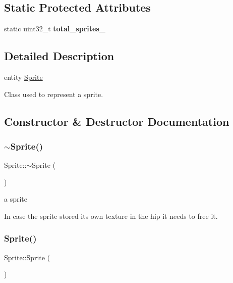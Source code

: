 \subsection*{Static Protected Attributes}
\begin{DoxyCompactItemize}
\item 
\mbox{\label{class_sprite_a1fc1356f60c3d969a5f4cf6b70759e0e}} 
static uint32\+\_\+t {\bfseries total\+\_\+sprites\+\_\+}
\end{DoxyCompactItemize}


\subsection{Detailed Description}
entity \hyperlink{class_sprite}{Sprite}

Class used to represent a sprite. 

\subsection{Constructor \& Destructor Documentation}
\mbox{\label{class_sprite_a8accab430f9d90ae5117b57d67e32b84}} 
\subsubsection{\texorpdfstring{$\sim$\+Sprite()}{~Sprite()}}
{\footnotesize\ttfamily Sprite\+::$\sim$\+Sprite (\begin{DoxyParamCaption}{ }\end{DoxyParamCaption})}

a sprite

In case the sprite stored it\textquotesingle{}s own texture in the hip it needs to free it. \mbox{\label{class_sprite_a12cba3ac1868418add3c4d95ce87e615}} 
\subsubsection{\texorpdfstring{Sprite()}{Sprite()}\hspace{0.1cm}{\footnotesize\ttfamily [1/2]}}
{\footnotesize\ttfamily Sprite\+::\+Sprite (\begin{DoxyParamCaption}{ }\end{DoxyParamCaption})\hspace{0.3cm}{\ttfamily [protected]}}

